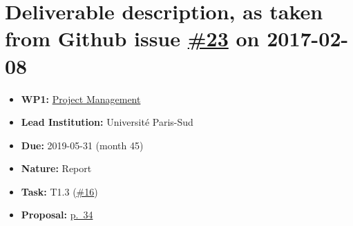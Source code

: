 \section*{\texorpdfstring{Deliverable description, as taken from Github
issue
\href{https://github.com/OpenDreamKit/OpenDreamKit/issues/23}{\#23} on
2017-02-08}{Deliverable description, as taken from Github issue \#23 on 2017-02-08}}\label{deliverable-description-as-taken-from-github-issue-23-on-2017-02-08}

\begin{itemize}
\tightlist
\item
  \textbf{WP1:}
  \href{https://github.com/OpenDreamKit/OpenDreamKit/tree/master/WP1}{Project
  Management}
\item
  \textbf{Lead Institution:} Université Paris-Sud
\item
  \textbf{Due:} 2019-05-31 (month 45)
\item
  \textbf{Nature:} Report
\item
  \textbf{Task:} T1.3
  (\href{https://github.com/OpenDreamKit/OpenDreamKit/issues/16}{\#16})
\item
  \textbf{Proposal:}
  \href{https://github.com/OpenDreamKit/OpenDreamKit/raw/master/Proposal/proposal-www.pdf}{p.~34}
\end{itemize}
